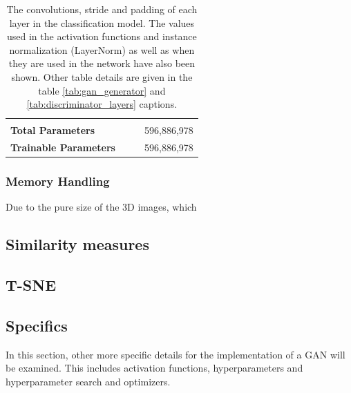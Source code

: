 \documentclass[12pt, fleqn, titlepage]{article}
\begin{document}
\begin{table}[H]
\begin{tabular}{llll}
			&                &             &               \\
			\textbf{Total Parameters}                   &                &             & 596,886,978    \\
			\textbf{Trainable Parameters}               &                &             & 596,886,978    \\ \bottomrule
		\end{tabular}
		\caption{The convolutions, stride and padding of each layer in the classification model. The values used in the activation functions and instance normalization (LayerNorm) as well as when they are used in the network have also been shown. Other table details are given in the table \ref{tab:gan_generator} and \ref{tab:discriminator_layers} captions.}
\end{table}	

	\subsubsection{Memory Handling}
	Due to the pure size of the 3D images, which 

\subsection{Similarity measures}

\subsection{T-SNE}

\subsection{Specifics}\label{model_specifics}
In this section, other more specific details for the implementation of a GAN will be examined. This includes activation functions, hyperparameters and hyperparameter search and optimizers.
\end{document}
